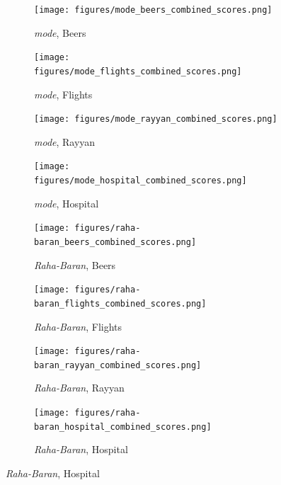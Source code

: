 \documentclass[10pt]{article} %
\numberwithin{equation}{section}
\begin{document}
\begin{figure}[htbp]
  \centering
  \footnotesize %
  \setlength{\abovecaptionskip}{2pt} %
  \setlength{\belowcaptionskip}{0pt} %

  \begin{subfigure}{0.48\linewidth} %
    \centering
    \texttt{[image: figures/mode\_beers\_combined\_scores.png]}
    \caption{\textit{mode}, Beers}
    \label{fig:mode_beers}
  \end{subfigure}
  \hfill
  \begin{subfigure}{0.48\linewidth}
    \centering
    \texttt{[image: figures/mode\_flights\_combined\_scores.png]}
    \caption{\textit{mode}, Flights}
    \label{fig:mode_flights}
  \end{subfigure}

  \vspace{0.2em} %

  \begin{subfigure}{0.48\linewidth}
    \centering
    \texttt{[image: figures/mode\_rayyan\_combined\_scores.png]}
    \caption{\textit{mode}, Rayyan}
    \label{fig:mode_rayyan}
  \end{subfigure}
  \hfill
  \begin{subfigure}{0.48\linewidth}
    \centering
    \texttt{[image: figures/mode\_hospital\_combined\_scores.png]}
    \caption{\textit{mode}, Hospital}
    \label{fig:mode_hospital}
  \end{subfigure}

  \vspace{0.2em} %

  \begin{subfigure}{0.48\linewidth}
    \centering
    \texttt{[image: figures/raha-baran\_beers\_combined\_scores.png]}
    \caption{\textit{Raha-Baran}, Beers}
    \label{fig:raha_baran_beers}
  \end{subfigure}
  \hfill
  \begin{subfigure}{0.48\linewidth}
    \centering
    \texttt{[image: figures/raha-baran\_flights\_combined\_scores.png]}
    \caption{\textit{Raha-Baran}, Flights}
    \label{fig:raha_baran_flights}
  \end{subfigure}

  \vspace{0.2em} %

  \begin{subfigure}{0.48\linewidth}
    \centering
    \texttt{[image: figures/raha-baran\_rayyan\_combined\_scores.png]}
    \caption{\textit{Raha-Baran}, Rayyan}
    \label{fig:raha_baran_rayyan}
  \end{subfigure}
  \hfill
  \begin{subfigure}{0.48\linewidth}
    \centering
    \texttt{[image: figures/raha-baran\_hospital\_combined\_scores.png]}
    \caption{\textit{Raha-Baran}, Hospital}
    \label{fig:raha_baran_hospital}
  \end{subfigure}


\end{figure}
\end{document}
